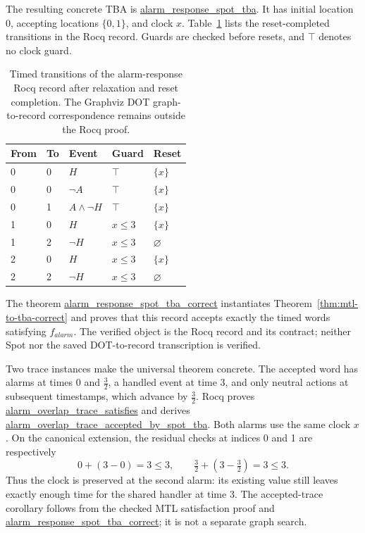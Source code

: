 \documentclass{ieeeaccess}
\newcommand{\Rocqid}[1]{\url{#1}}
\begin{document}
The resulting concrete TBA is \Rocqid{alarm_response_spot_tba}. It has initial
location $0$, accepting locations $\{0,1\}$, and clock $x$. Table~\ref{tab:alarm-tba}
lists the reset-completed transitions in the Rocq record. Guards are checked
before resets, and $\top$ denotes no clock guard.
\begin{table}[t]
\centering
\caption{Timed transitions of the alarm-response Rocq record after
relaxation and reset completion. The Graphviz DOT graph-to-record correspondence remains
outside the Rocq proof.}
\label{tab:alarm-tba}
\begin{tabular}{@{}p{}p{}p{}p{}p{}@{}}
\toprule
From & To & Event & Guard & Reset\\
\midrule
0 & 0 & $H$ & $\top$ & $\{x\}$\\
0 & 0 & $\neg A$ & $\top$ & $\{x\}$\\
0 & 1 & $A\land\neg H$ & $\top$ & $\{x\}$\\
1 & 0 & $H$ & $x\le3$ & $\{x\}$\\
1 & 2 & $\neg H$ & $x\le3$ & $\varnothing$\\
2 & 0 & $H$ & $x\le3$ & $\{x\}$\\
2 & 2 & $\neg H$ & $x\le3$ & $\varnothing$\\
\bottomrule
\end{tabular}
\end{table}
The theorem \Rocqid{alarm_response_spot_tba_correct} instantiates
Theorem~\ref{thm:mtl-to-tba-correct} and proves that this record accepts
exactly the timed words satisfying $f_{\mathit{alarm}}$. The verified object
is the Rocq record and its contract; neither Spot nor the saved DOT-to-record
transcription is verified.

Two trace instances make the universal theorem concrete. The accepted word
has alarms at times $0$ and $\tfrac32$, a handled event at time $3$, and only
neutral actions at subsequent timestamps, which advance by $\tfrac32$.
Rocq proves \Rocqid{alarm_overlap_trace_satisfies} and derives
\Rocqid{alarm_overlap_trace_accepted_by_spot_tba}. Both alarms use the same
clock $x$. On the canonical extension, the residual checks at indices 0 and 1
are respectively
\[
  0+(3-0)=3\le3,
  \qquad
  \tfrac32+(3-\tfrac32)=3\le3.
\]
Thus the clock is preserved at the second alarm: its existing value still
leaves exactly enough time for the shared handler at time 3. The accepted-trace
corollary follows from the checked MTL satisfaction proof and
\Rocqid{alarm_response_spot_tba_correct}; it is not a separate graph search.
\end{document}
